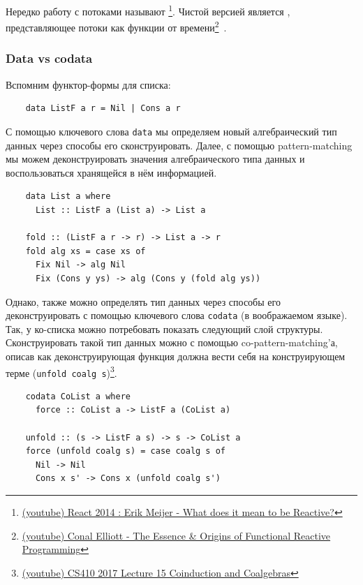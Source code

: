 Нередко работу с потоками называют \footnote{\href{https://youtu.be/sTSQlYX5DU0?si=Xhfi62ScXHBBjdBx}{(youtube) React 2014 : Erik Meijer - What does it mean to be Reactive?}}.
Чистой версией является , представляющее потоки как функции от времени\footnote{\href{https://youtu.be/rfmkzp76M4M?si=TRBq8wWbcDOhSbIO}{(youtube) Conal Elliott - The Essence \& Origins of Functional Reactive Programming}}~\cite{elliott1997functional}.

\subsubsection{Data vs codata} \label{subsubsec:data-codata}

Вспомним функтор-формы для списка:
\begin{verbatim}
    data ListF a r = Nil | Cons a r
\end{verbatim}

С помощью ключевого слова \texttt{data} мы определяем новый алгебраический тип данных через способы его сконструировать.
Далее, с помощью pattern-matching мы можем деконструировать значения алгебраического типа данных и воспользоваться хранящейся в нём информацией.
\begin{verbatim}
    data List a where
      List :: ListF a (List a) -> List a

    fold :: (ListF a r -> r) -> List a -> r
    fold alg xs = case xs of
      Fix Nil -> alg Nil
      Fix (Cons y ys) -> alg (Cons y (fold alg ys))
\end{verbatim}

Однако, также можно определять тип данных через способы его деконструировать с помощью ключевого слова \texttt{codata} (в воображаемом языке).
Так, у ко-списка можно потребовать показать следующий слой структуры.
Сконструировать такой тип данных можно с помощью co-pattern-matching'а, описав как деконструирующая функция должна вести себя на конструирующем терме (\texttt{unfold coalg s})\footnote{\href{https://youtu.be/ZCdYIEwcna0?si=XEQSBFhnehQFZPxy}{(youtube) CS410 2017 Lecture 15 Coinduction and Coalgebras}}.
\begin{verbatim}
    codata CoList a where
      force :: CoList a -> ListF a (CoList a)

    unfold :: (s -> ListF a s) -> s -> CoList a
    force (unfold coalg s) = case coalg s of
      Nil -> Nil
      Cons x s' -> Cons x (unfold coalg s')
\end{verbatim}

